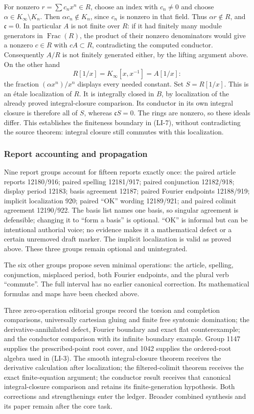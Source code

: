 For nonzero \(r=\sum c_nx^n\in R\), choose an index with \(c_n\ne0\) and choose \(\alpha\in K_\infty\setminus K_n\). Then \(\alpha c_n\notin K_n\), since \(c_n\) is nonzero in that field. Thus \(\alpha r\notin R\), and \(\mathfrak c=0\). In particular \(A\) is not finite over \(R\): if it had finitely many module generators in \(\operatorname{Frac}(R)\), the product of their nonzero denominators would give a nonzero \(c\in R\) with \(cA\subset R\), contradicting the computed conductor. Consequently \(A/R\) is not finitely generated either, by the lifting argument above. On the other hand \[
R[1/x]=K_\infty[x,x^{-1}]=A[1/x]:
\] the fraction \((\alpha x^n)/x^n\) displays every needed constant. Set \(S=R[1/x]\). This is an étale localization of \(R\). It is integrally closed in \(B\), by localization of the already proved integral-closure comparison. Its conductor in its own integral closure is therefore all of \(S\), whereas \(\mathfrak cS=0\). The rings are nonzero, so these ideals differ. This establishes the finiteness boundary in (LI-7), without contradicting the source theorem: integral closure still commutes with this localization.

\subsubsection{Report accounting and propagation}\label{algebra-proof-054-report-accounting-and-propagation}

Nine report groups account for fifteen reports exactly once: the paired article reports 12180/916; paired spelling 12181/917; paired conjunction 12182/918; display period 12183; basis agreement 12187; paired Fourier endpoints 12188/919; implicit localization 920; paired ``OK'' wording 12189/921; and paired colimit agreement 12190/922. The basis list names one basis, so singular agreement is defensible; changing it to ``form a basis'' is optional. ``OK'' is informal but can be intentional authorial voice; no evidence makes it a mathematical defect or a certain unremoved draft marker. The implicit localization is valid as proved above. These three groups remain optional and unintegrated.

The six other groups propose seven minimal operations: the article, spelling, conjunction, misplaced period, both Fourier endpoints, and the plural verb ``commute''. The full interval has no earlier canonical correction. Its mathematical formulas and maps have been checked above.

Three zero-operation editorial groups record the torsion and completion comparisons, universally cartesian gluing and finite free syntomic domination; the derivative-annihilated defect, Fourier boundary and exact flat counterexample; and the conductor comparison with its infinite boundary example. Group 1147 supplies the prescribed-point root cover, and 1042 supplies the ordered-root algebra used in (LI-3). The smooth integral-closure theorem receives the derivative calculation after localization; the filtered-colimit theorem receives the exact finite-equation argument; the conductor result receives that canonical integral-closure comparison and retains its finite-generation hypothesis. Both corrections and strengthenings enter the ledger. Broader combined synthesis and its paper remain after the core task.
